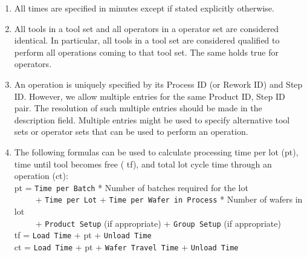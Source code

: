    \begin{enumerate}
   \item All times are specified in minutes except if stated explicitly
   otherwise.
   \item  All tools in a tool set and all operators in a operator set
   are considered identical.  In particular, all tools in a tool set
   are considered qualified to perform all operations coming to that
   tool set.  The same holds true for operators.
   \item  An operation is uniquely specified by its Process ID
   (or Rework ID) and Step ID.
   However, we allow multiple entries
   for the same Product ID, Step ID pair.  The resolution of such
   multiple entries should be made in the description field.
   Multiple entries might be used to specify alternative tool sets
   or operator sets that can be used to perform an operation.
   \item The following formulas can be used to calculate processing
   time per lot (pt), time until tool becomes free (
   tf), and
   total lot cycle time through an operation (ct): \\
   pt = \verb+Time per Batch+ * Number of batches required for the lot \\
   ~~~~~+ \verb+Time per Lot+  +  \verb+Time per Wafer in Process+
    * Number of wafers in lot \\
   ~~~~~+ \verb+Product Setup+ (if appropriate) +
   \verb+Group Setup+ (if appropriate) \\
   tf = \verb+Load Time+ + pt + \verb+Unload Time+ \\
   ct = \verb+Load Time+ + pt + \verb+Wafer Travel Time+ +
   \verb+Unload Time+ \\
   

\end{enumerate}
